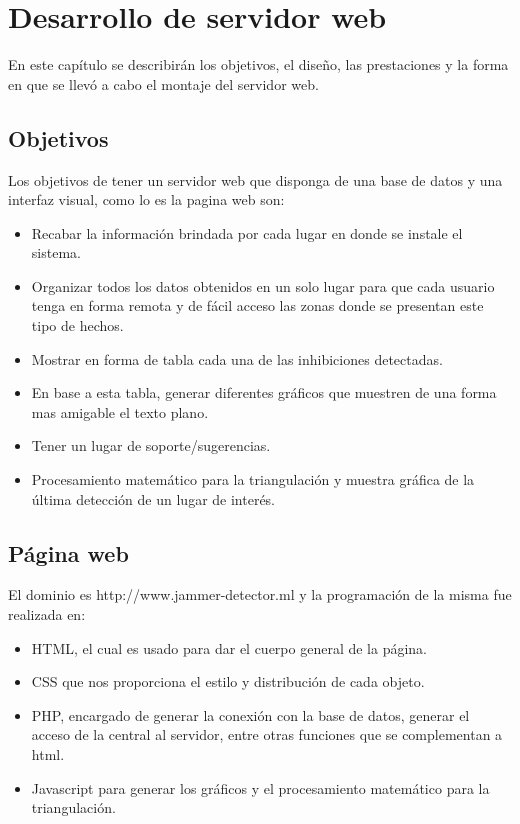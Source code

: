 \chapter{Desarrollo de servidor web}
\par En este capítulo se describirán los objetivos, el diseño, las prestaciones y la forma en que se llevó a cabo el montaje del servidor web.
\section{Objetivos}
\par Los objetivos de tener un servidor web que disponga de una base de datos y una interfaz visual, como lo es la pagina web son:

    \begin{itemize}
        \item Recabar la información brindada por cada lugar en donde se instale el sistema.
        \item Organizar todos los datos obtenidos en un solo lugar para que cada usuario tenga en forma remota y de fácil acceso las zonas donde se presentan este tipo de hechos. 
        \item Mostrar en forma de tabla cada una de las inhibiciones detectadas.
        \item En base a esta tabla, generar diferentes gráficos que muestren de una forma mas amigable el texto plano.
        \item Tener un lugar de soporte/sugerencias.
        \item Procesamiento matemático para la triangulación y muestra gráfica de la última detección de un lugar de interés. 
    \end{itemize}

\section{Página web}
El dominio es http://www.jammer-detector.ml y la programación de la misma fue realizada en:
\begin{itemize}
    \item HTML, el cual es usado para dar el cuerpo general de la página.
    \item CSS que nos proporciona el estilo y distribución de cada objeto.
    \item PHP, encargado de generar la conexión con la base de datos, generar el acceso de la central al servidor, entre otras funciones que se complementan a html.
    \item Javascript para generar los gráficos y el procesamiento matemático para la triangulación.
\end{itemize}

